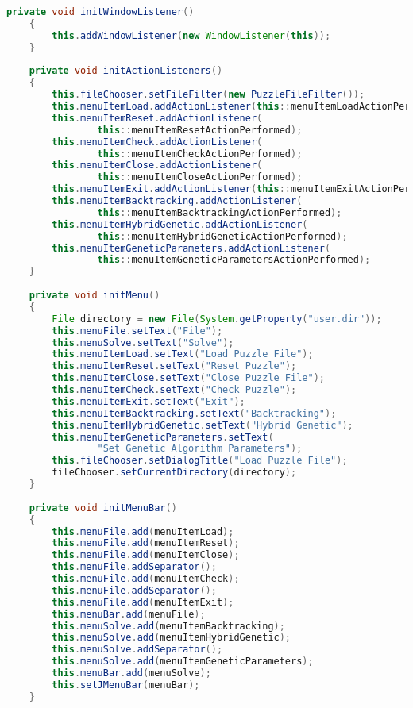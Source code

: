 \begin{lstlisting}[language=Java,basicstyle=\tiny,caption=Calcudoku.java]
    private void initWindowListener()
    {
        this.addWindowListener(new WindowListener(this));
    }
    
    private void initActionListeners()
    {
        this.fileChooser.setFileFilter(new PuzzleFileFilter());      
        this.menuItemLoad.addActionListener(this::menuItemLoadActionPerformed);
        this.menuItemReset.addActionListener(
                this::menuItemResetActionPerformed);
        this.menuItemCheck.addActionListener(
                this::menuItemCheckActionPerformed);
        this.menuItemClose.addActionListener(
                this::menuItemCloseActionPerformed);
        this.menuItemExit.addActionListener(this::menuItemExitActionPerformed);
        this.menuItemBacktracking.addActionListener(
                this::menuItemBacktrackingActionPerformed);
        this.menuItemHybridGenetic.addActionListener(
                this::menuItemHybridGeneticActionPerformed);
        this.menuItemGeneticParameters.addActionListener(
                this::menuItemGeneticParametersActionPerformed);
    }
    
    private void initMenu()
    {
        File directory = new File(System.getProperty("user.dir"));
        this.menuFile.setText("File");
        this.menuSolve.setText("Solve");
        this.menuItemLoad.setText("Load Puzzle File");
        this.menuItemReset.setText("Reset Puzzle");
        this.menuItemClose.setText("Close Puzzle File");
        this.menuItemCheck.setText("Check Puzzle");
        this.menuItemExit.setText("Exit");
        this.menuItemBacktracking.setText("Backtracking");
        this.menuItemHybridGenetic.setText("Hybrid Genetic");
        this.menuItemGeneticParameters.setText(
                "Set Genetic Algorithm Parameters");
        this.fileChooser.setDialogTitle("Load Puzzle File");
        fileChooser.setCurrentDirectory(directory);
    }
    
    private void initMenuBar()
    {
        this.menuFile.add(menuItemLoad);
        this.menuFile.add(menuItemReset);
        this.menuFile.add(menuItemClose);
        this.menuFile.addSeparator();
        this.menuFile.add(menuItemCheck);
        this.menuFile.addSeparator();
        this.menuFile.add(menuItemExit);
        this.menuBar.add(menuFile);
        this.menuSolve.add(menuItemBacktracking);
        this.menuSolve.add(menuItemHybridGenetic);
        this.menuSolve.addSeparator();
        this.menuSolve.add(menuItemGeneticParameters);
        this.menuBar.add(menuSolve);
        this.setJMenuBar(menuBar);
    }
    

\end{lstlisting}
